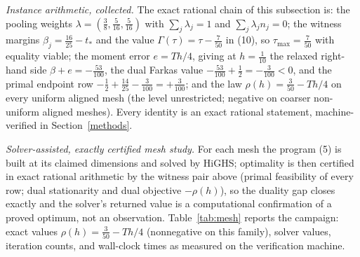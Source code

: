 \documentclass[10pt,twocolumn]{article}
\theoremstyle{plain}
\theoremstyle{definition}
\theoremstyle{remark}
\begin{document}
\emph{Instance arithmetic, collected.} The exact rational chain of this
subsection is: the pooling weights
\(\lambda = (\tfrac38, \tfrac5{16}, \tfrac5{16})\) with
\(\sum_j \lambda_j = 1\) and \(\sum_j \lambda_j n_j = 0\); the
witness margins \(\beta_j = \tfrac{16}{25} - t_*\) and the value
\(\Gamma(\tau) = \tau - \tfrac7{50}\) in (10), so
\(\tau_{\max} = \tfrac7{50}\) with equality viable; the moment error
\(e = Th/4\), giving at \(h = \tfrac1{10}\) the relaxed right-hand
side \(\beta + e = -\tfrac{53}{100}\), the dual Farkas value
\(-\tfrac{53}{100} + \tfrac12 = -\tfrac3{100} < 0\), and the primal
endpoint row \( -\tfrac12 + \tfrac{14}{25} - \tfrac3{100} =
+\tfrac3{100}\); and the law \(\rho(h) = \tfrac3{50} - Th/4\) on every uniform aligned
mesh (the level unrestricted; negative on coarser non-uniform aligned
meshes). Every identity is an
exact rational statement, machine-verified in
Section~\ref{methods}.

\emph{Solver-assisted, exactly certified mesh study.} For each mesh the
program (5) is built
at its claimed dimensions and solved by HiGHS; optimality is then certified
in exact rational arithmetic by the witness pair above (primal feasibility of
every row; dual stationarity and dual objective \(-\rho(h)\)), so the duality
gap closes exactly and the solver's returned value is a computational
confirmation of a proved optimum, not an observation.
Table~\ref{tab:mesh} reports the campaign: exact values
\(\rho(h) = \tfrac{3}{50} - Th/4\) (nonnegative on this family), solver values, iteration
counts, and wall-clock times as measured on the verification machine.
\end{document}
